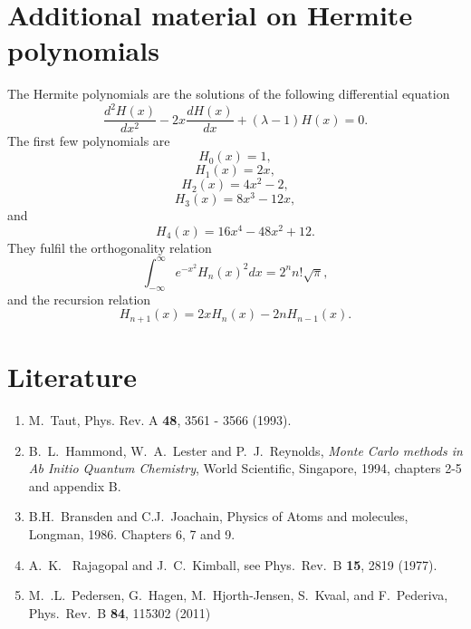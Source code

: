 \documentclass[10pt]{article}
\begin{document}
\section*{Additional material on Hermite polynomials}

The Hermite polynomials are the solutions of the following differential
equation
\begin{equation}
   \frac{d^2H(x)}{dx^2}-2x\frac{dH(x)}{dx}+(\lambda-1)H(x)=0.
   \label{eq:hermite}
\end{equation}
The first few polynomials are
\[
   H_0(x)=1,
\]
\[
    H_1(x)=2x,
\]
\[
    H_2(x)=4x^2-2,
\]
\[
    H_3(x)=8x^3-12x,
\]
and
\[
    H_4(x)=16x^4-48x^2+12.
\]
They fulfil the orthogonality relation
\[
  \int_{-\infty}^{\infty}e^{-x^2}H_n(x)^2dx=2^nn!\sqrt{\pi},
\]
and the recursion relation
\[
  H_{n+1}(x)=2xH_{n}(x)-2nH_{n-1}(x).
\]




\section*{Literature}
\begin{enumerate}
\item M.~Taut, Phys. Rev. A {\bf 48}, 3561 - 3566 (1993).
\item B.~L.~Hammond, W.~A.~Lester and P.~J.~Reynolds, {\em Monte Carlo methods in Ab Initio Quantum Chemistry}, World Scientific, Singapore, 1994, chapters
2-5 and appendix B.
\item B.H.~Bransden and C.J.~Joachain, Physics of Atoms and molecules,
Longman, 1986. Chapters 6, 7 and 9.
\item A.~K.~ Rajagopal and J.~C.~Kimball, see Phys.~Rev.~B {\bf 15}, 2819 (1977).
\item M.~.L.~Pedersen, G.~Hagen, M.~Hjorth-Jensen, S.~Kvaal,  and F.~Pederiva, Phys.~Rev.~B {\bf 84}, 115302 (2011)
\end{enumerate}
\end{document}
